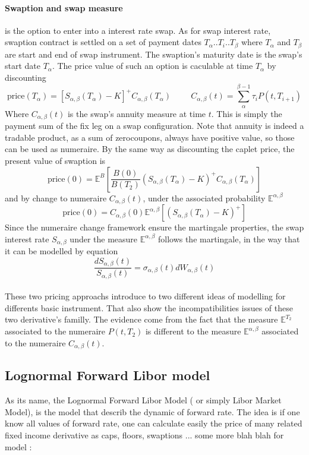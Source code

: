 \documentclass[a4paper,10pt]{article}
\newcommand{\Ta}{T_{\alpha}}
\newcommand{\Tb}{T_{\beta}}
\newcommand{\Ptii}{P(t,T_{i+1})}
\newcommand{\Sab}{S_{\alpha,\beta}}
\newcommand{\Cab}{C_{\alpha,\beta}}
\newcommand{\Wab}{W_{\alpha,\beta}}
\newcommand{\sigmaab}{\sigma_{\alpha,\beta}}
\newcommand{\Eab}{\mathbb{E}^{\alpha,\beta}}
\begin{document}
\paragraph{ Swaption and swap measure } is the option to enter into a interest rate swap. As for swap interest rate, swaption contract is settled on a set of payment dates $\Ta.. T_i.. \Tb$ where $\Ta$ and $\Tb$ are start and end of swap instrument. The swaption's maturity date is the swap's start date $\Ta$. The price value of such an option is caculable at time $\Ta$ by discounting
\[
\text{price}(\Ta) = \left[ \Sab(\Ta) - K \right]^+ \Cab(\Ta)
\hspace{1cm}
\Cab(t) = \sum^{\beta-1}_{\alpha} \tau_i \Ptii 
\]  
Where $\Cab(t)$ is the swap's annuity measure at time $t$. This is simply the payment sum of the fix leg on a swap configuration. Note that annuity is indeed a tradable product, as a sum of zerocoupons, always have positive value, so those can be used as numeraire. By the same way as discounting the caplet price, the present value of swaption is
\[
\text{price}(0) = \mathbb{E}^{B}\left[ \frac{B(0)}{B(T_2)} (\Sab(\Ta) - K )^+ \Cab(\Ta)  \right]
\]
and by change to numeraire $\Cab(t)$, under the associated probability $\Eab$
\[
\text{price}(0) = \Cab(0) \Eab \left[ (\Sab(\Ta) - K )^+  \right]
\]
Since the numeraire change framework ensure the martingale properties, the swap interest rate $\Sab$ under the measure $\Eab$ follows the martingale, in the way that it can be modelled by equation
\[
\frac{d\Sab(t)}{\Sab(t)} = \sigmaab(t) d\Wab(t)
\]
\paragraph{} These two pricing approachs introduce to two different ideas of modelling for differents basic instrument. That also show the incompatibilities issues of these two derivative's familly. The evidence come from the fact that the measure $\mathbb{E}^{T_2}$ associated to the numeraire $P(t,T_2)$ is different to the measure $\Eab$ associated to the numeraire $\Cab(t)$.   

\subsection{Lognormal Forward Libor model}
As its name, the Lognormal Forward Libor Model ( or simply Libor Market Model), is the model that describ the dynamic of forward rate. The idea is if one know all values of forward rate, one can calculate easily the price of many related fixed income derivative as caps, floors, swaptions ... {\color{red} some more blah blah for model :}
\end{document}
